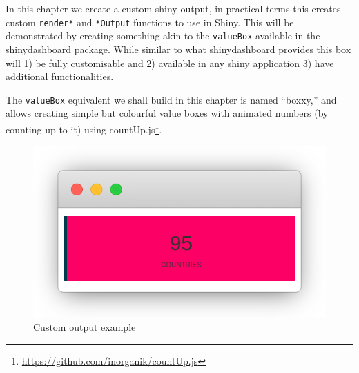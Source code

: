 \documentclass[
]{krantz}
\makeatletter
\newenvironment{Shaded}{\begin{snugshade}}{\end{snugshade}}
\newcommand{\ControlFlowTok}[1]{\textcolor[rgb]{0.27,0.27,0.27}{\textbf{#1}}}
\newcommand{\DecValTok}[1]{\textcolor[rgb]{0.06,0.06,0.06}{#1}}
\newcommand{\KeywordTok}[1]{\textcolor[rgb]{0.27,0.27,0.27}{\textbf{#1}}}
\newcommand{\NormalTok}[1]{#1}
\newcommand{\OperatorTok}[1]{\textcolor[rgb]{0.43,0.43,0.43}{\textbf{#1}}}
\newcommand{\StringTok}[1]{\textcolor[rgb]{0.5,0.5,0.5}{#1}}
\renewcommand{\href}[2]{#2\footnote{\url{#1}}}
\newenvironment{kframe}{%
\medskip{}
\setlength{\fboxsep}{.8em}
 \def\at@end@of@kframe{}%
 \ifinner\ifhmode%
  \def\at@end@of@kframe{\end{minipage}}%
  \begin{minipage}{\columnwidth}%
 \fi\fi%
 \def\FrameCommand##1{\hskip\@totalleftmargin \hskip-\fboxsep
 \colorbox{shadecolor}{##1}\hskip-\fboxsep
     \hskip-\linewidth \hskip-\@totalleftmargin \hskip\columnwidth}%
 \MakeFramed {\advance\hsize-\width
   \@totalleftmargin\z@ \linewidth\hsize
   \@setminipage}}%
 {\par\unskip\endMakeFramed%
 \at@end@of@kframe}
\renewenvironment{Shaded}{\begin{kframe}}{\end{kframe}}
\makeatother
\begin{document}
In this chapter we create a custom shiny output, in practical terms this creates custom \texttt{render*} and \texttt{*Output} functions to use in Shiny. This will be demonstrated by creating something akin to the \texttt{valueBox} available in the shinydashboard \citep{R-shinydashboard} package. While similar to what shinydashboard provides this box will 1) be fully customisable and 2) available in any shiny application 3) have additional functionalities.

The \texttt{valueBox} equivalent we shall build in this chapter is named ``boxxy,'' and allows creating simple but colourful value boxes with animated numbers (by counting up to it) using \href{https://github.com/inorganik/countUp.js}{countUp.js}.

\begin{Shaded}
\end{Shaded}

\begin{figure}
\centering
\includegraphics{images/boxxy-example.png}
\caption{Custom output example}
\end{figure}
\end{document}
